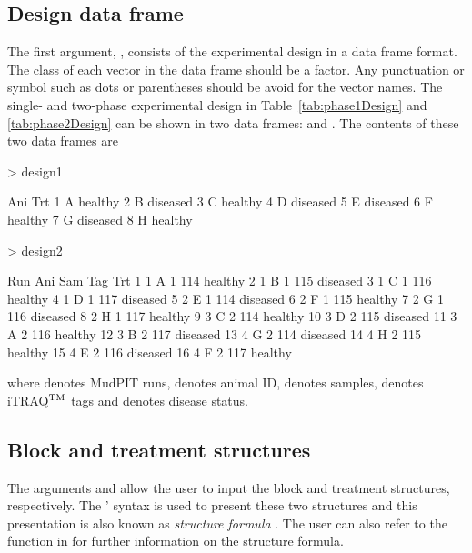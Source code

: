 \documentclass[article]{jss}
\begin{document}
\subsection{Design data frame}
The first argument, , consists of the experimental design in a data frame format. The class of each vector in the data frame should be a factor. Any punctuation or symbol such as dots or parentheses should be avoid for the vector names. The single- and two-phase experimental design in Table~\ref{tab:phase1Design} and \ref{tab:phase2Design} can be shown in two data frames:  and . The contents of these two data frames are
\begin{CodeChunk}
\begin{CodeInput}
> design1
\end{CodeInput}
\begin{CodeOutput}
  Ani      Trt
1   A  healthy
2   B diseased
3   C  healthy
4   D diseased
5   E diseased
6   F  healthy
7   G diseased
8   H  healthy
\end{CodeOutput}

\begin{CodeInput}
> design2
\end{CodeInput}
\begin{CodeOutput}
   Run Ani Sam Tag      Trt
1    1   A   1 114  healthy
2    1   B   1 115 diseased
3    1   C   1 116  healthy
4    1   D   1 117 diseased
5    2   E   1 114 diseased
6    2   F   1 115  healthy
7    2   G   1 116 diseased
8    2   H   1 117  healthy
9    3   C   2 114  healthy
10   3   D   2 115 diseased
11   3   A   2 116  healthy
12   3   B   2 117 diseased
13   4   G   2 114 diseased
14   4   H   2 115  healthy
15   4   E   2 116 diseased
16   4   F   2 117  healthy
\end{CodeOutput}
\end{CodeChunk}
where  denotes MudPIT runs,  denotes animal ID,  denotes samples,  denotes iTRAQ$^{\rm TM}$ tags and  denotes disease status.

\subsection{Block and treatment structures}
The arguments  and  allow the user to input the block and treatment structures, respectively. The \citeauthor{Wilkinson1973}' syntax is used to present these two structures and this presentation is also known as \emph{structure formula} \citep{Wilkinson1973}. The user can also refer to the  function in  for further information on the structure formula. 
 
\end{document}
